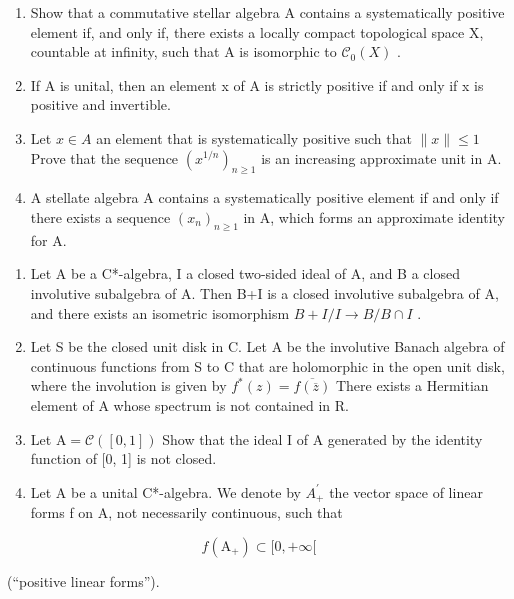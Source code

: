 \begin{enumerate}
\def\labelenumi{\alph{enumi})}
\item
  Show that a commutative stellar algebra A contains a systematically positive element if, and only if, there exists a locally compact topological space X, countable at infinity, such that A is isomorphic to \(\mathcal{C}_{0}(X)\) .
\item
  If A is unital, then an element x of A is strictly positive if and only if x is positive and invertible.
\item
  Let \(x \in A\) an element that is systematically positive such that \(\|x\| \leqslant 1\) Prove that the sequence \((x^{1/n})_{n \geqslant 1}\) is an increasing approximate unit in A.
\item
  A stellate algebra A contains a systematically positive element if and only if there exists a sequence \((x_{n})_{n\geqslant1}\) in A, which forms an approximate identity for A.
\end{enumerate}

\begin{enumerate}
\def\labelenumi{\arabic{enumi})}
\setcounter{enumi}{19}
\item
  Let A be a C*-algebra, I a closed two-sided ideal of A, and B a closed involutive subalgebra of A. Then B+I is a closed involutive subalgebra of A, and there exists an isometric isomorphism \(B + I/I \rightarrow B/B \cap I\) .
\item
  Let S be the closed unit disk in C. Let A be the involutive Banach algebra of continuous functions from S to C that are holomorphic in the open unit disk, where the involution is given by \(f^{*}(z) = \overline{f(\overline{z})}\) There exists a Hermitian element of A whose spectrum is not contained in R.
\item
  Let \(\mathrm{A} = \mathcal{C}([0,1])\) Show that the ideal I of A generated by the identity function of {[}0, 1{]} is not closed.
\item
  Let A be a unital C*-algebra. We denote by \(A_{+}^{\prime}\) the vector space of linear forms f on A, not necessarily continuous, such that
\end{enumerate}

\[
f (\mathrm{A} _ {+}) \subset [ 0, + \infty [
\]

(“positive linear forms”).

